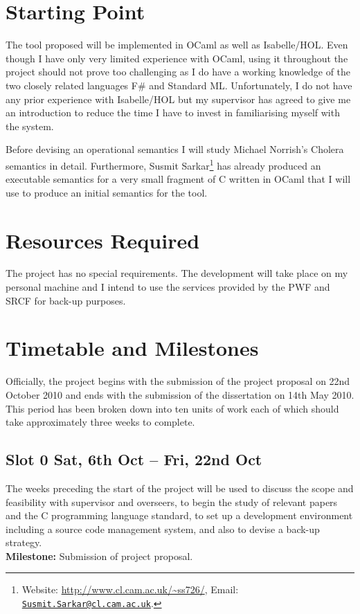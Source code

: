 \documentclass[12pt,a4paper,titlepage]{article}
\begin{document}
\section*{Starting Point}
The tool proposed will be implemented in OCaml as well as Isabelle/HOL. Even though I have only very limited experience with OCaml, using it throughout the project should not prove too challenging as I do have a working knowledge of the two closely related languages F\# and Standard ML. Unfortunately, I do not have any prior experience with Isabelle/HOL but my supervisor has agreed to give me an introduction to reduce the time I have to invest in familiarising myself with the system.

Before devising an operational semantics I will study Michael Norrish's Cholera semantics in detail. Furthermore, Susmit Sarkar\footnote{Website: \url{http://www.cl.cam.ac.uk/~ss726/}, Email: \href{mailto:Susmit.Sarkar@cl.cam.ac.uk}{\nolinkurl{Susmit.Sarkar@cl.cam.ac.uk}}.} has already produced an executable semantics for a very small fragment of C written in OCaml that I will use to produce an initial semantics for the tool.

\section*{Resources Required}
The project has no special requirements. The development will take place on my personal machine and I intend to use the services provided by the PWF and SRCF for back-up purposes.

\section*{Timetable and Milestones}
Officially, the project begins with the submission of the project proposal on 22nd October 2010 and ends with the submission of the dissertation on 14th May 2010. This period has been broken down into ten units of work each of which should take approximately three weeks to complete.

\subsection*{Slot 0 \hfill {\small Sat, 6th Oct -- Fri, 22nd Oct}}
The weeks preceding the start of the project will be used to discuss the scope and feasibility with supervisor and overseers, to begin the study of relevant papers and the C programming language standard, to set up a development environment including a source code management system, and also to devise a back-up strategy.
\\
{\bfseries Milestone:} Submission of project proposal.
\end{document}
